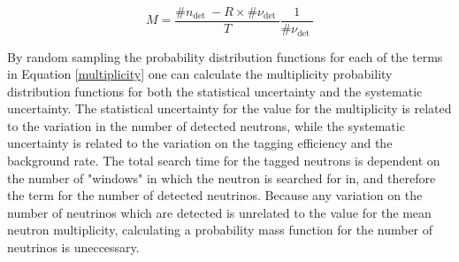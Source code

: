 \begin{equation}
    M=\frac{\# n_{\text {det }}-R \times \# \nu_{\text {det }}}{T} \frac{1}{\# \nu_{\text {det }}}
 \label{multiplicity}
\end{equation}



By random sampling the probability distribution functions for each of the terms in Equation \eqref{multiplicity} one can calculate the multiplicity probability distribution functions for both the statistical uncertainty and the systematic uncertainty. The statistical uncertainty for the value for the multiplicity is related to the variation in the number of detected neutrons, while the systematic uncertainty is related to the variation on the tagging efficiency and the background rate. The total search time for the tagged neutrons is dependent on the number of "windows" in which the neutron is searched for in, and therefore the term for the number of detected neutrinos. Because any variation on the number of neutrinos which are detected is unrelated to the value for the mean neutron multiplicity, calculating a probability mass function for the number of neutrinos is uneccessary. 

